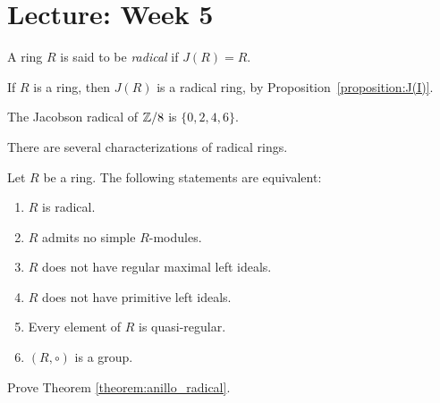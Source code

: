 \section{Lecture: Week 5}

\begin{definition}
A ring $R$ is said to be \emph{radical} if $J(R)=R$. 
\end{definition}

\begin{example}
	If $R$ is a ring, then $J(R)$ is a radical ring, by Proposition~\ref{proposition:J(I)}.
\end{example}

\begin{example}
	The Jacobson radical of $\mathbb{Z}/8$ is $\{0,2,4,6\}$. 
\end{example}

There are several characterizations of radical rings. 

\begin{theorem}
	\label{theorem:anillo_radical}
	Let $R$ be a ring. The following statements are equivalent: 
	\begin{enumerate}
		\item $R$ is radical.
		\item $R$ admits no simple $R$-modules. 
		\item $R$ does not have regular maximal left ideals.
		\item $R$ does not have primitive left ideals.
		\item Every element of $R$ is quasi-regular. 
		\item $(R,\circ)$ is a group. 
	\end{enumerate}
\end{theorem}

\begin{exercise}
    Prove Theorem \ref{theorem:anillo_radical}. 
\end{exercise}
%    
%
%	
%	
%

